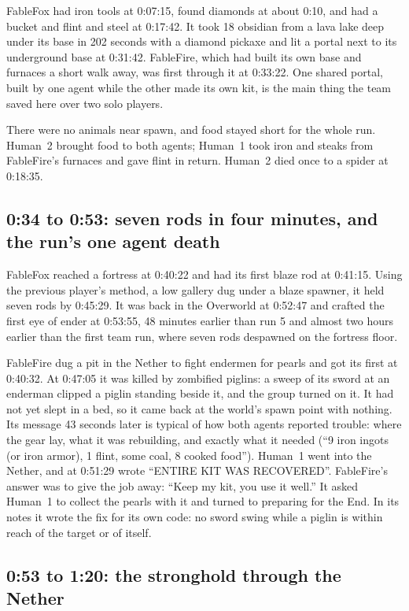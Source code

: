 \documentclass[11pt,a4paper]{article}
\begin{document}
FableFox had iron tools at 0:07:15, found diamonds at about 0:10, and had a bucket and flint and steel at 0:17:42. It took 18 obsidian from a lava lake deep under its base in 202 seconds with a diamond pickaxe and lit a portal next to its underground base at 0:31:42. FableFire, which had built its own base and furnaces a short walk away, was first through it at 0:33:22. One shared portal, built by one agent while the other made its own kit, is the main thing the team saved here over two solo players.

There were no animals near spawn, and food stayed short for the whole run. Human~2 brought food to both agents; Human~1 took iron and steaks from FableFire's furnaces and gave flint in return. Human~2 died once to a spider at 0:18:35.

\subsection{0:34 to 0:53: seven rods in four minutes, and the run's one agent death}

FableFox reached a fortress at 0:40:22 and had its first blaze rod at 0:41:15. Using the previous player's method, a low gallery dug under a blaze spawner, it held seven rods by 0:45:29. It was back in the Overworld at 0:52:47 and crafted the first eye of ender at 0:53:55, 48 minutes earlier than run 5 and almost two hours earlier than the first team run, where seven rods despawned on the fortress floor.

FableFire dug a pit in the Nether to fight endermen for pearls and got its first at 0:40:32. At 0:47:05 it was killed by zombified piglins: a sweep of its sword at an enderman clipped a piglin standing beside it, and the group turned on it. It had not yet slept in a bed, so it came back at the world's spawn point with nothing. Its message 43 seconds later is typical of how both agents reported trouble: where the gear lay, what it was rebuilding, and exactly what it needed (``9 iron ingots (or iron armor), 1 flint, some coal, 8 cooked food''). Human~1 went into the Nether, and at 0:51:29 wrote ``ENTIRE KIT WAS RECOVERED''. FableFire's answer was to give the job away: ``Keep my kit, you use it well.'' It asked Human~1 to collect the pearls with it and turned to preparing for the End. In its notes it wrote the fix for its own code: no sword swing while a piglin is within reach of the target or of itself.

\subsection{0:53 to 1:20: the stronghold through the Nether}
\end{document}

